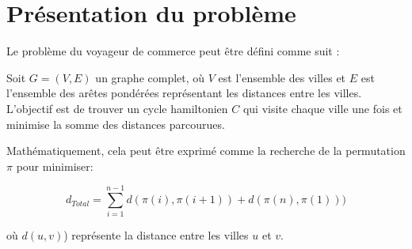 \section{Présentation du problème}

Le problème du voyageur de commerce peut être défini comme suit :

Soit $G=(V,E)$ un graphe complet, où $V$ est l'ensemble des villes et $E$ est l'ensemble des arêtes pondérées représentant les distances entre les villes. L'objectif est de trouver un cycle hamiltonien $C$ qui visite chaque ville une fois et minimise la somme des distances parcourues.
\newline

Mathématiquement, cela peut être exprimé comme la recherche de la permutation $\pi$ pour minimiser:

$$ d_{Total} = \sum_{i=1}^{n-1}d(\pi(i),\pi(i+1))+d(\pi(n),\pi(1)))$$

où $d(u,v)$) représente la distance entre les villes $u$ et $v$.
